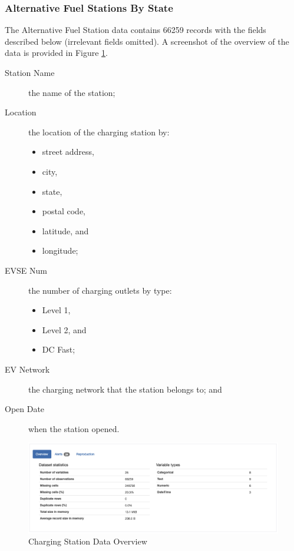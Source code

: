 \documentclass{article}
\begin{document}
\subsubsection{Alternative Fuel Stations By State}
The Alternative Fuel Station data contains 66259 records with the fields
described below (irrelevant fields omitted).  A screenshot of
the overview of the data is provided in Figure \ref{fig:stations}.
\begin{description}
    \item[Station Name] the name of the station;
    \item[Location] the location of the charging station by:
    \begin{itemize}
        \item street address,
        \item city,
        \item state,
        \item postal code,
        \item latitude, and
        \item longitude;
    \end{itemize}
    \item[EVSE Num] the number of charging outlets by type:
    \begin{itemize}
        \item Level 1,
        \item Level 2, and
        \item DC Fast;
    \end{itemize}
    \item[EV Network] the charging network that the station belongs to; and
    \item[Open Date] when the station opened.
\end{description}

\begin{figure}[ht]
    \centering
    \includegraphics[scale=0.3]{stations.png}
    \caption{Charging Station Data Overview}
    \label{fig:stations}
\end{figure}
\end{document}
